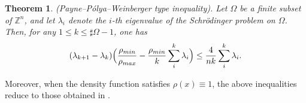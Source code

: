 \documentclass[11pt]{article}
\newtheorem{theorem}{Theorem}[section]
\theoremstyle{definition}
\theoremstyle{remark}
\numberwithin{equation}{section}
\begin{document}
\noindent
\begin{theorem}\label{thm:1.4} (Payne--Pólya--Weinberger type inequality).
Let $\Omega$ be a finite subset of $\mathbb{Z}^n$, and let $\lambda_i$ denote the $i$-th eigenvalue of the Schrödinger problem on $\Omega$.
Then, for any $1 \le k \le \sharp \Omega - 1$, one has
\begin{align}
  (\lambda_{k+1}-\lambda_k)\Bigl(\frac{\rho_{min}}{\rho_{max}}-\frac{\rho_{min}}{k}\sum_{i}^{k}\lambda_i\Bigr)\le\frac{4}{nk}\sum_{i}^{k}\lambda_i.
  \end{align}
\end{theorem}
  \par
Moreover, when the density function satisfies $\rho(x) \equiv 1$, the above inequalities reduce to those obtained in \cite{hua2023payne}.
\end{document}
